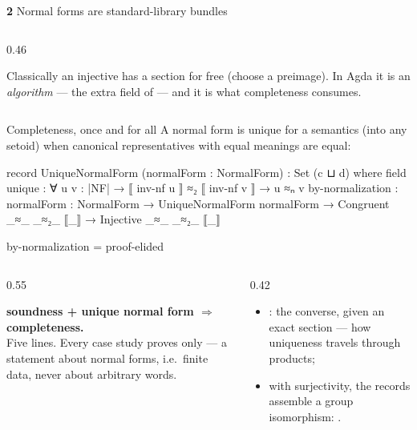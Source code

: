 \begin{frame}{\textbf{2}\; Normal forms are standard-library bundles}
\begin{columns}[c]
\begin{column}{0.46\textwidth}
\vspace{6pt}
\begin{idea}[title={Constructively, the section is data}]
\small Classically an injective  has a section for free (choose a
preimage). In Agda it is an \emph{algorithm} --- the extra field of
 --- and it is what completeness consumes.
\end{idea}
\end{column}
\end{columns}
\end{frame}

\begin{frame}{Completeness, once and for all}
A normal form is \alert{unique} for a semantics  (into any setoid) when
canonical representatives with equal meanings are equal:
\begin{code}
record UniqueNormalForm (normalForm : NormalForm) : Set (c ⊔ d) where
  field unique : ∀ {u v : |NF|} → ⟦ inv-nf u ⟧ ≈₂ ⟦ inv-nf v ⟧ → u ≈ₙ v
by-normalization : {normalForm : NormalForm} → UniqueNormalForm normalForm →
  Congruent _≈_ _≈₂_ ⟦_⟧ → Injective _≈_ _≈₂_ ⟦_⟧
\end{code}
\begin{code}[hide]
by-normalization = proof-elided
\end{code}
\vspace{4pt}
\begin{columns}[c]
\begin{column}{0.55\textwidth}
\begin{win}
\textbf{soundness + unique normal form $\Rightarrow$ completeness.}\\[2pt]
\small Five lines. Every case study proves only  --- a statement
about \alert{normal forms}, i.e.\ finite data, never about arbitrary words.
\end{win}
\end{column}
\begin{column}{0.42\textwidth}
\small
\begin{itemize}
  \item {}: the converse, given an exact section --- how
        uniqueness travels through products;
  \item with surjectivity, the records assemble a group isomorphism:
        .
\end{itemize}
\end{column}
\end{columns}
\end{frame}
